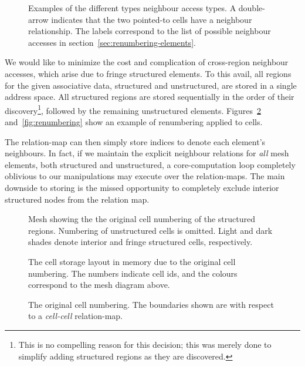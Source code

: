 \begin{figure}
	
	\caption{Examples of the different types neighbour access types. A double-arrow indicates that the two pointed-to cells have a neighbour relationship. The labels correspond to the list of possible neighbour accesses in section~\ref{sec:renumbering-elements}.}
	\label{fig:neighbour-types}
\end{figure}

We would like to minimize the cost and complication of cross-region neighbour accesses, which arise due to fringe structured elements. To this avail, all regions for the given associative data, structured and unstructured, are stored in a single address space. All structured regions are stored sequentially in the order of their discovery\footnote{This is no compelling reason for this decision; this was merely done to simplify adding structured regions as they are discovered.}, followed by the remaining unstructured elements. Figures~\ref{fig:original-numbering} and~\ref{fig:renumbering} show an example of renumbering applied to cells.

The relation-map can then simply store indices to denote each element's neighbours. In fact, if we maintain the explicit neighbour relations for \emph{all} mesh elements, both structured and unstructured, a core-computation loop completely oblivious to our manipulations may execute over the relation-maps.
The main downside to storing is the missed opportunity to completely exclude interior structured nodes from the relation map.


\newlength{\charheight}

\begin{figure}[H]
\sidebysidevertical
{
	
	\caption{Mesh showing the the original cell numbering of the structured regions. Numbering of unstructured cells is omitted. Light and dark shades denote interior and fringe structured cells, respectively.}
}
{
	\small
	\tabcolsep=0.32mm
	
	\caption{The cell storage layout in memory due to the original cell numbering. The numbers indicate cell ids, and the colours correspond to the mesh diagram above.}
}
\caption{The original cell numbering. The boundaries shown are with respect to a \emph{cell-cell} relation-map.}
\label{fig:original-numbering}
\end{figure}


